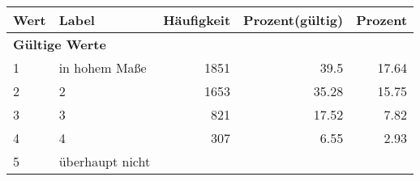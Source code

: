      \begin{longtable}{lXrrr}
     \toprule
     \textbf{Wert} & \textbf{Label} & \textbf{Häufigkeit} & \textbf{Prozent(gültig)} & \textbf{Prozent} \\
     \endhead
     \midrule
     \multicolumn{5}{l}{\textbf{Gültige Werte}}\\

     1 &
     \multicolumn{1}{X}{ in hohem Maße   } &


       \num{1851} &
       \num[round-mode=places,round-precision=2]{39.5} &
         \num[round-mode=places,round-precision=2]{17.64} \\

     2 &
     \multicolumn{1}{X}{ 2   } &


       \num{1653} &
       \num[round-mode=places,round-precision=2]{35.28} &
         \num[round-mode=places,round-precision=2]{15.75} \\

     3 &
     \multicolumn{1}{X}{ 3   } &


       \num{821} &
       \num[round-mode=places,round-precision=2]{17.52} &
         \num[round-mode=places,round-precision=2]{7.82} \\

     4 &
     \multicolumn{1}{X}{ 4   } &


       \num{307} &
       \num[round-mode=places,round-precision=2]{6.55} &
         \num[round-mode=places,round-precision=2]{2.93} \\

     5 &
     \multicolumn{1}{X}{ überhaupt nicht   } &



\end{longtable}
